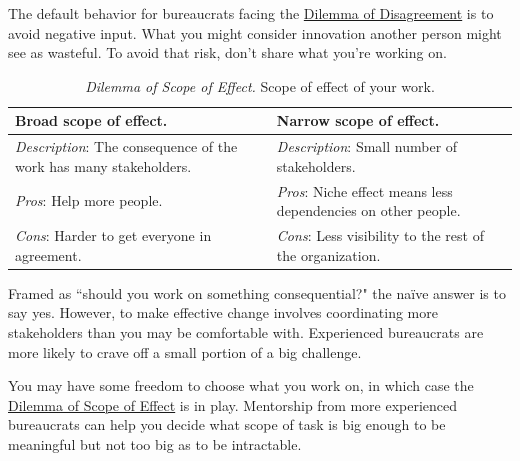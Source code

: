 %
The default behavior for bureaucrats facing the \hyperref[table:dilemma-personal-opposition-involve-ignore]{Dilemma of Disagreement} is to avoid negative input. What you might consider innovation another person might see as wasteful. To avoid that risk, don't share what you're working on.

\begin{center}
\begin{table}[H] %
\begin{tabular}{ | m{\dilemmatablewidth}| m{\dilemmatablewidth} | } 
  \hline
  \textbf{Broad scope of effect.} &
  \textbf{Narrow scope of effect.} \\
  \hline
  \textit{Description}: The consequence of the work has many stakeholders. &
  \textit{Description}: Small number of stakeholders. \\  
  \hline
  \textit{Pros}: Help more people. &
  \textit{Pros}: Niche effect means less dependencies on other people. \\
  \hline
  \textit{Cons}: Harder to get everyone in agreement. & 
  \textit{Cons}: Less visibility to the rest of the organization. \\
  \hline
\end{tabular}
\caption{
\textit{Dilemma of Scope of Effect.}
Scope of effect of your work. 
}
\label{table:dilemma-personal-scope-broad-vs-narrow}
\end{table}
\end{center}

Framed as ``should you work on something consequential?" the na\"ive answer is to say yes. However, to make effective change involves coordinating more stakeholders than you may be comfortable with. Experienced bureaucrats are more likely to crave off a small portion of a big challenge.

You may have some freedom to choose what you work on, in which case the \hyperref[table:dilemma-personal-scope-broad-vs-narrow]{Dilemma of Scope of Effect} is in play. Mentorship from more experienced bureaucrats can help you decide what scope of task is big enough to be meaningful but not too big as to be intractable.


